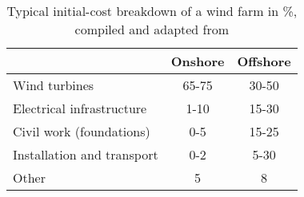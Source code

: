 \begin{table}
\label{tab:typicalcost}

\begin{tabular}{lcc}
\hline 
 & Onshore & Offshore \\ 
\hline
Wind turbines & 65-75 & 30-50 \\ 
Electrical infrastructure & 1-10 & 15-30 \\ 
Civil work (foundations) & 0-5 & 15-25 \\ 
Installation and transport & 0-2 & 5-30 \\ 
Other & 5 & 8 \\ 
\hline 
\end{tabular}
\caption{Typical initial-cost breakdown of a wind farm in \%, compiled and adapted from \cite{Henderson2003, Junginger2004, UK10, TCE12, IRENA12, Voormolen_2016}}
\end{table}



